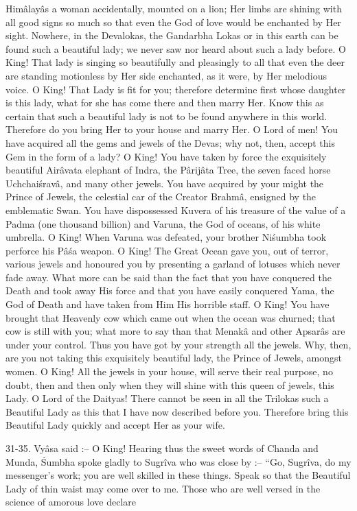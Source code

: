 Him\^alay\^as a woman accidentally, mounted on a lion; Her limbs are shining with all good signs so much so that even the God of love would be enchanted by Her sight. Nowhere, in the Devalokas, the Gandarbha Lokas or in this earth can be found such a beautiful lady; we never saw nor heard about such a lady before. O King! That lady is singing so beautifully and pleasingly to all that even the deer are standing motionless by Her side enchanted, as it were, by Her melodious voice. O King! That Lady is fit for you; therefore determine first whose daughter is this lady, what for she has come there and then marry Her. Know this as certain that such a beautiful lady is not to be found anywhere in this world. Therefore do you bring Her to your house and marry Her. O Lord of men! You have acquired all the gems and jewels of the Devas; why not, then, accept this Gem in the form of a lady? O King! You have taken by force the exquisitely beautiful Air\^avata elephant of Indra, the P\^arij\^ata Tree, the seven faced horse Uchchai\'srav\^a, and many other jewels. You have acquired by your might the Prince of Jewels, the celestial car of the Creator Brahm\^a, ensigned by the emblematic Swan. You have dispossessed Kuvera of his treasure of the value of a Padma (one thousand billion) and Varuna, the God of oceans, of his white umbrella. O King! When Varuna was defeated, your brother Ni\'sumbha took perforce his P\^a\'sa weapon. O King! The Great Ocean gave you, out of terror, various jewels and honoured you by presenting a garland of lotuses which never fade away. What more can be said than the fact that you have conquered the Death and took away His force and that you have easily conquered Yama, the God of Death and have taken from Him His horrible staff. O King! You have brought that Heavenly cow which came out when the ocean was churned; that cow is still with you; what more to say than that Menak\^a and other Apsar\^as are under your control. Thus you have got by your strength all the jewels. Why, then, are you not taking this exquisitely beautiful lady, the Prince of Jewels, amongst women. O King! All the jewels in your house, will serve their real purpose, no doubt, then and then only when they will shine with this queen of jewels, this Lady. O Lord of the Daityas! There cannot be seen in all the Trilokas such a Beautiful Lady as this that I have now described before you. Therefore bring this Beautiful Lady quickly and accept Her as your wife.

31-35. Vy\^asa said :-- O King! Hearing thus the sweet words of Chanda and Munda, \'Sumbha spoke gladly to Sugr\^iva who was close by :-- ``Go, Sugr\^iva, do my messenger's work; you are well skilled in these things. Speak so that the Beautiful Lady of thin waist may come over to me. Those who are well versed in the science of amorous love declare

